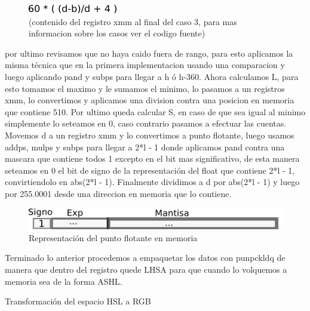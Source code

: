 \documentclass[a4paper]{article}
\begin{document}
\begin{figure}[H]
\centering
\includegraphics[scale=0.8]{imagenes/resultH.png}
\caption{(contenido del registro xmm al final del caso 3, para mas informacion sobre los casos ver el codigo fuente)}
\label{lshValue}
\end{figure}

 por ultimo revisamos que no haya caido fuera de rango, para esto aplicamos la misma técnica que en la primera implementacion usando una comparacion y luego aplicando pand y subps para llegar a h ó h-360.
 \newline
Ahora calculamos L, para esto tomamos el maximo y le sumamos el minimo, lo pasamos a un registros xmm, lo convertimos y aplicamos una division contra una posicion en memoria que contiene 510.
\newline
Por ultimo queda calcular S, en caso de que sea igual al minimo simplemente lo seteamos en 0, caso contrario pasamos a efectuar las cuentas. Movemos d a un registro xmm y lo convertimos a punto flotante, luego usamos addps, mulps y subps para llegar a 2*l - 1 donde aplicamos pand contra una mascara que contiene todos 1 excepto en el bit mas significativo, de esta manera seteamos en 0 el bit de signo de la representación del float que contiene 2*l - 1, convirtiendolo en abs(2*l - 1). Finalmente dividimos a d por abs(2*l - 1) y luego por 255.0001 desde una direccion en memoria que lo contiene.
\newline

\begin{figure}[H]
\centering
\includegraphics[scale=0.8]{imagenes/representacionfloat.png}
\caption{Representación del punto flotante en memoria}
\label{lshValue}
\end{figure}

Terminado lo anterior procedemos a empaquetar los datos con punpckldq de manera que dentro del registro quede LHSA para que cuando lo volquemos a memoria sea de la forma ASHL.
\newline\newline

Transformación del espacio HSL a RGB
\newline\newline
\end{document}
